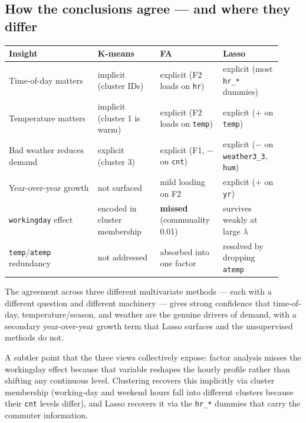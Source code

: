 \documentclass[11pt]{article}
\begin{document}
\subsection*{How the conclusions agree --- and where they differ}

\begin{center}
\begin{tabular}{p{0.30\linewidth} p{0.21\linewidth} p{0.21\linewidth} p{0.20\linewidth}}
\toprule
\textbf{Insight} & \textbf{K-means} & \textbf{FA} & \textbf{Lasso} \\
\midrule
Time-of-day matters
 & implicit (cluster IDs)
 & explicit (F2 loads on \texttt{hr})
 & explicit (most \texttt{hr\_*} dummies) \\
Temperature matters
 & implicit (cluster 1 is warm)
 & explicit (F2 loads on \texttt{temp})
 & explicit ($+$ on \texttt{temp}) \\
Bad weather reduces demand
 & explicit (cluster 3)
 & explicit (F1, $-$ on \texttt{cnt})
 & explicit ($-$ on \texttt{weather3\_3}, \texttt{hum}) \\
Year-over-year growth
 & not surfaced
 & mild loading on F2
 & explicit ($+$ on \texttt{yr}) \\
\texttt{workingday} effect
 & encoded in cluster membership
 & \textbf{missed} (communality 0.01)
 & survives weakly at large $\lambda$ \\
\texttt{temp}/\texttt{atemp} redundancy
 & not addressed
 & absorbed into one factor
 & resolved by dropping \texttt{atemp} \\
\bottomrule
\end{tabular}
\end{center}

The agreement across three different multivariate methods --- each
with a different question and different machinery --- gives strong
confidence that time-of-day, temperature/season, and
weather are the genuine drivers of demand, with a secondary
year-over-year growth term that Lasso surfaces and the
unsupervised methods do not.

A subtler point that the three views collectively expose: factor
analysis misses the workingday effect because that variable
reshapes the hourly profile rather than shifting any continuous
level. Clustering recovers this implicitly via cluster membership
(working-day and weekend hours fall into different clusters
because their \texttt{cnt} levels differ), and Lasso recovers it
via the \texttt{hr\_*} dummies that carry the commuter information.
\end{document}
